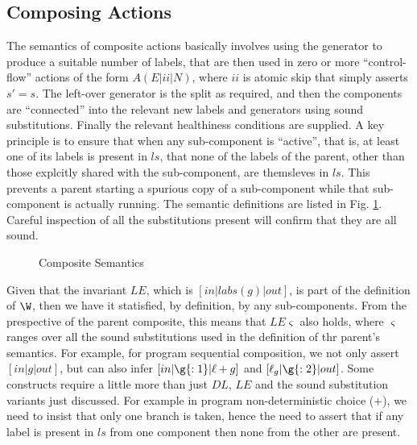 \subsection{Composing Actions}\label{ssec:composing}

The semantics of composite actions basically involves using the generator
to produce a suitable number of labels,
that are then used in zero or more ``control-flow'' actions
of the form $A(E|ii|N)$, where $ii$ is atomic skip that simply asserts $s'=s$.
The left-over generator is the split as required,
and then the components are ``connected'' into
the relevant new labels and generators using sound substitutions.
Finally the relevant healthiness conditions are supplied.
A key principle is to ensure that when any sub-component is ``active'',
that is, at least one of its labels is present in $ls$,
that none of the labels of the parent, other than those explcitly shared with the
sub-component, are themsleves in $ls$.
This prevents a parent starting a spurious copy of a sub-component
while that sub-component is actually running.
The semantic definitions are listed in Fig. \ref{fig:composite-semantics}.
Careful inspection of all the substitutions present will confirm that they
are all sound.
\begin{figure}
  \caption{Composite Semantics}
\label{fig:composite-semantics}
\end{figure}
Given that the invariant $LE$, which is $[in|labs(g)|out]$,
is part of the definition of $\W$,
then we have it statisfied, by definition, by any sub-components.
From the prespective of the parent composite, this means that $LE\varsigma$
also holds, where $\varsigma$ ranges over all the sound substitutions
used in the definition of thr parent's semantics.
For example, for program sequential composition,
we not only assert $[in|g|out]$,
but can also infer $[in|\g{:1}|\ell+g]$
and $[\ell_g|\g{:2}|out]$.
Some constructs require a little more than just $DL$, $LE$ and the sound substitution
variants just discussed.
For example in program non-deterministic choice ($+$),
we need to insist that only one branch is taken, hence
the need to assert that if any label is present in $ls$ from one component
then none from the other are present.


